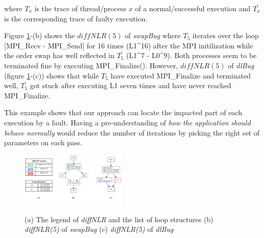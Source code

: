 where $T_x$ is the trace of thread/process $x$ of a normal/successful execution and $T^\prime_x$ is the corresponding trace of faulty execution.

Figure \ref{fig.gdiffs}-(b) shows the $diffNLR(5)$ of \textit{swapBug} where $T_5$ iterates over the loop [MPI\_Recv - MPI\_Send] for 16 times (L1\^{}16) after the MPI initilization while the order swap has well reflected in $T_5^\prime$ (L1\^{}7 - L0\^{}9). Both processes seem to be terminated fine by executing MPI\_Finalize(). 
However, $diffNLR(5)$ of \textit{dlBug} (figure \ref{fig.gdiffs}-(c)) shows that while $T_5$ have executed MPI\_Finalize and terminated well, $T_5^\prime$ got stuck after executing L1 seven times and have never reached MPI\_Finalize.

This example shows that our approach can locate the impacted part of each execution by a fault. Having a pre-understanding of \textit{how the application should behave normally} would reduce the number of iterations by picking the right set of parameters on each pass. 




\begin{figure}[]
\centering
\caption{(a) The legend of \textit{diffNLR} and the list of loop structures (b) \textit{diffNLR(5)} of \textit{swapBug} (c) \textit{diffNLR(5)} of \textit{dlBug}}
\includegraphics[width=0.45\textwidth]{figs/sampleGdiff.png}
\label{fig.gdiffs}
\end{figure}


